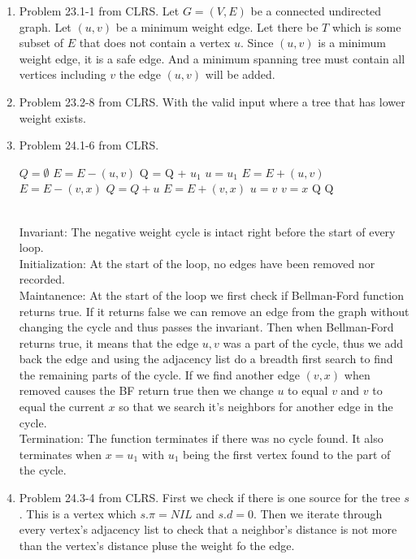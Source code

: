 \documentclass[letterpaper,11pt]{article}
\begin{document}
\begin{enumerate}
\item Problem 23.1-1 from CLRS.
Let $G = (V,E)$ be a connected undirected graph. Let $(u,v)$ be a minimum weight edge. Let there be $T$ which is some subset of $E$ that does not contain a vertex $u$. Since $(u,v)$ is a minimum weight edge, it is a safe edge. And a minimum spanning tree must contain all vertices including $v$ the edge $(u,v)$ will be added.
\item Problem 23.2-8 from CLRS.
With the valid input where a tree that has lower weight exists.
\item Problem 24.1-6 from CLRS.
\begin{algorithm}
\begin{algorithmic}[1]
\State $Q = \emptyset$
\State $E = E - (u,v)$
\State Q = Q + $u_1$
\State $u = u_1$
\State $E = E + (u,v)$
\State $E = E - (v,x)$
\State $Q = Q + u$
\State $E = E + (v,x)$
\State $u = v$
\State $v = x$
\State \Return Q
\EndIf
\EndIf
\EndFor
\EndIf
\EndFor
\State \Return Q
\EndFunction
\end{algorithmic}
\end{algorithm}
\\Invariant: The negative weight cycle is intact right before the start of every loop.
\\Initialization: At the start of the loop, no edges have been removed nor recorded.
\\Maintanence: At the start of the loop we first check if Bellman-Ford function returns true. If it returns false we can remove an edge from the graph without changing the cycle and thus passes the invariant. Then when Bellman-Ford returns true, it means that the edge $u,v$ was a part of the cycle, thus we add back the edge and using the adjacency list do a breadth first search to find the remaining parts of the cycle. If we find another edge $(v,x)$ when removed causes the BF return true then we change $u$ to equal $v$ and $v$ to equal the current $x$ so that we search it's neighbors for another edge in the cycle.
\\Termination: The function terminates if there was no cycle found. It also terminates when $x = u_1$ with $u_1$ being the first vertex found to the part of the cycle.
\item Problem 24.3-4 from CLRS.
First we check if there is one source for the tree $s$. This is a vertex which $s.\pi = NIL$ and $s.d = 0$. Then we iterate through every vertex's adjacency list to check that a neighbor's distance is not more than the vertex's distance pluse the weight fo the edge. \end{enumerate}
\end{document}
